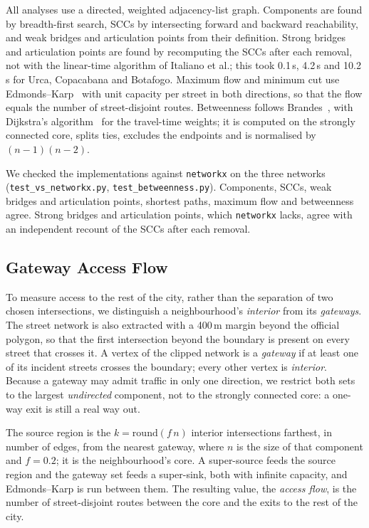 \documentclass[runningheads]{llncs}
\begin{document}
All analyses use a directed, weighted adjacency-list graph. Components are
found by breadth-first search, SCCs by intersecting forward and backward
reachability, and weak bridges and articulation points from their definition.
Strong bridges and articulation points are found by recomputing the SCCs after
each removal, not with the linear-time algorithm of Italiano et al.; this took
0.1\,s, 4.2\,s and 10.2\,s for Urca, Copacabana and Botafogo. Maximum flow and
minimum cut use Edmonds--Karp~\cite{edmonds1972theoretical} with unit capacity
per street in both directions, so that the flow equals the number of
street-disjoint routes. Betweenness follows Brandes~\cite{brandes2001faster},
with Dijkstra's algorithm~\cite{dijkstra1959note} for the travel-time weights;
it is computed on the strongly connected core, splits ties, excludes the
endpoints and is normalised by $(n-1)(n-2)$.

We checked the implementations against \texttt{networkx} on the three networks
(\texttt{test\_vs\_networkx.py}, \texttt{test\_betweenness.py}). Components, SCCs,
weak bridges and articulation points, shortest paths, maximum flow and
betweenness agree. Strong bridges and articulation points, which
\texttt{networkx} lacks, agree with an independent recount of the SCCs after
each removal.

\subsection{Gateway Access Flow}
\label{sec:access-flow}

To measure access to the rest of the city, rather than the separation of two
chosen intersections, we distinguish a neighbourhood's \emph{interior} from its
\emph{gateways}. The street network is also extracted with a 400\,m margin
beyond the official polygon, so that the first intersection beyond the boundary
is present on every street that crosses it. A vertex of the clipped network is
a \emph{gateway} if at least one of its incident streets crosses the boundary;
every other vertex is \emph{interior}. Because a gateway may admit traffic in
only one direction, we restrict both sets to the largest \emph{undirected}
component, not to the strongly connected core: a one-way exit is still a real
way out.

The source region is the $k=\mathrm{round}(f\,n)$ interior intersections
farthest, in number of edges, from the nearest gateway, where $n$ is the size of
that component and $f=0.2$; it is the neighbourhood's core. A super-source feeds
the source region and the gateway set feeds a super-sink, both with infinite
capacity, and Edmonds--Karp is run between them. The resulting value, the
\emph{access flow}, is the number of street-disjoint routes between the core and
the exits to the rest of the city.
\end{document}
